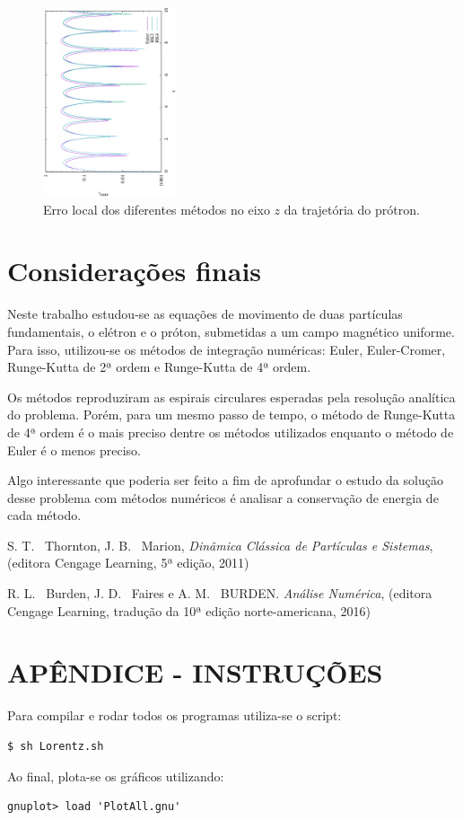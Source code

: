 \documentclass[brazilian, 12pt, a4paper, final]{article}
\begin{document}
\begin{multicols*}{2}
\begin{figure}[H]
  \centering
 \includegraphics[width=0.35\textwidth,angle=-90]{figuras/pz_error.eps}
  \caption{Erro local dos diferentes métodos no eixo $z$ da trajetória do prótron.}
\end{figure}


\section{Considerações finais}
Neste trabalho estudou-se as equações de movimento de duas partículas fundamentais, o elétron e o próton, submetidas a um campo magnético uniforme. Para isso, utilizou-se os métodos de integração numéricas: Euler, Euler-Cromer, Runge-Kutta de 2ª ordem e Runge-Kutta de 4ª ordem.

Os métodos reproduziram as espirais circulares esperadas pela resolução analítica do problema. Porém, para um mesmo passo de tempo, o método de Runge-Kutta de 4ª ordem é o mais preciso dentre os métodos utilizados enquanto o método de Euler é o menos preciso.

Algo interessante que poderia ser feito a fim de aprofundar o estudo da solução desse problema com métodos numéricos é analisar a conservação de energia de cada método. 

\begin{thebibliography}{n}
 S. T. ~Thornton, J. B. ~Marion, {\em Dinâmica Clássica de Partículas e Sistemas}, (editora Cengage Learning, 5ª edição, 2011)
  
 R. L. ~Burden, J. D. ~Faires e A. M. ~BURDEN. {\em Análise Numérica}, (editora Cengage Learning,  tradução da 10ª edição norte-americana, 2016)
  
\end{thebibliography}
\end{multicols*}

\appendix
\section{APÊNDICE - INSTRUÇÕES}

Para compilar e rodar todos os programas utiliza-se o script:
\begin{verbatim}
$ sh Lorentz.sh
\end{verbatim}

Ao final, plota-se os gráficos utilizando:
\begin{verbatim}
gnuplot> load 'PlotAll.gnu'
\end{verbatim}
\end{document}
